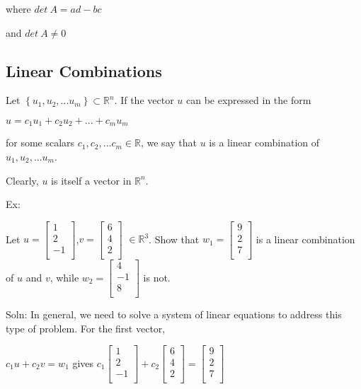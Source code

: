 \documentclass{extarticle}
\begin{document}
\begin{multicols}{2}
where $det\ A=ad-bc$

and $det\ A\neq0$

\subsection{Linear Combinations}
Let $\left\{u_1,u_2,... u_m\right\}\subset{\mathbb{R}}^n$. If the vector $u$ can be expressed in the form

$u = c_1u_1+c_2u_2+...+ c_mu_m$

for some scalars $c_1,c_2,... c_m\in\mathbb{R}$, we say that $u$ is a linear combination of $u_1,u_2,... u_m$.

Clearly, $u$ is itself a vector in ${\mathbb{R}}^n$.

\begin{tcolorbox}[enhanced jigsaw,sharp corners,coltext=black,colback=BurntOrange!25!white,boxrule=0pt,breakable,size=minimal]

Ex: 

Let 
$u=\left[\begin{matrix}1\\2\\-1\\\end{matrix}\right]$,$v=\left[\begin{matrix}6\\4\\2\\\end{matrix}\right]$ $\in{\mathbb{R}}^3$.
Show that
$w_1=\left[\begin{matrix}9\\2\\7\\\end{matrix}\right]$
is a linear combination of $u$ and $v$, while $w_2=\left[\begin{matrix}4\\-1\\8\\\end{matrix}\right]$ is not.



Soln: In general, we need to solve a system of linear equations to address this type of problem. For the first vector,


$c_1u+c_2v=w_1$ gives 
$c_1\left[\begin{matrix}1\\2\\-1\\\end{matrix}\right]+c_2\left[\begin{matrix}6\\4\\2\\\end{matrix}\right]=\left[\begin{matrix}9\\2\\7\\\end{matrix}\right]$


\end{tcolorbox}
\end{multicols}
\end{document}
